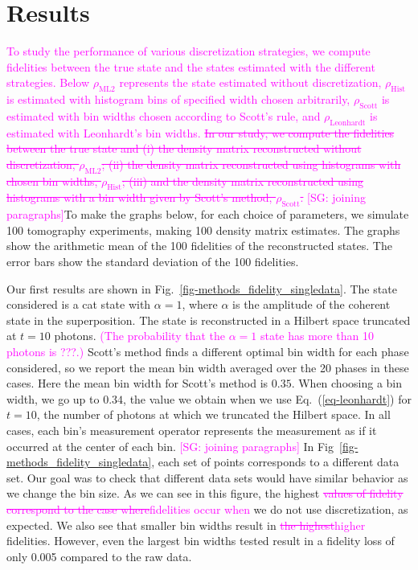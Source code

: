 \documentclass[
reprint,
superscriptaddress,
showpacs,
amsmath,
amssymb,
aps,
pra,
longbibliography
]{revtex4-1}
\providecommand{\aucmnt}[1]{#1}
\providecommand{\editcolor}[2]{\textcolor{#1}{#2}}
\providecommand{\aucmnt}[1]{}
\providecommand{\editcolor}[2]{#2}
\newcommand{\SG}[1]{\editcolor{magenta}{#1}}
\newcommand{\SGs}[1]{\aucmnt{\editcolor{magenta}{\sout{#1}}}}
\newcommand{\SGc}[1]{\aucmnt{\editcolor{magenta}{[SG: #1]}}}
\begin{document}
\section{Results}
\label{results}
\SG{To study the performance of various discretization strategies, we
  compute fidelities between the true state and the states estimated
  with the different strategies. Below $\rho_{\mathrm{ML2}}$
  represents the state estimated without discretization,
  $\rho_{\mathrm{Hist}}$ is estimated with histogram bins of specified
  width chosen arbitrarily, $\rho_{\mathrm{Scott}}$ is estimated with
  bin widths chosen according to Scott's rule, and
  $\rho_{\mathrm{Leonhardt}}$ is estimated with Leonhardt's bin
  widths.} \SGs{In our study, we compute the fidelities between the
  true state and (i) the density matrix reconstructed without
  discretization, $\rho_{\mathrm{ML2}}$; (ii) the density matrix
  reconstructed using histograms with chosen bin widths,
  $\rho_{\mathrm{Hist}}$; (iii) and the density matrix reconstructed
  using histograms with a bin width given by Scott's method,
  $\rho_{\mathrm{Scott}}$.}  \SGc{joining paragraphs}To make the
graphs below, for each choice of parameters, we simulate 100
tomography experiments, making 100 density matrix estimates.  The
graphs show the arithmetic mean of the 100 fidelities of the
reconstructed states. The error bars show the standard deviation of
the 100 fidelities.

Our first results are shown in
Fig.~\ref{fig-methods_fidelity_singledata}. The state considered is a
cat state with $\alpha = 1$, where $\alpha$ is the amplitude of the
coherent state in the superposition.  The state is reconstructed in a
Hilbert space truncated at $t=10$ photons. \SG{(The probability that
  the $\alpha=1$ state has more than 10 photons is ???.)} Scott's
method finds a different optimal bin width for each phase considered,
so we report the mean bin width averaged over the 20 phases in these
cases.  Here the mean bin width for Scott's method is $0.35$.  When
choosing a bin width, we go up to $0.34$, the value we obtain when we
use Eq.~(\ref{eq-leonhardt}) for $t=10$, the number of photons at
which we truncated the Hilbert space.  In all cases, each bin's
measurement operator represents the measurement as if it occurred at
the center of each bin. \SGc{joining paragraphs} In
Fig~\ref{fig-methods_fidelity_singledata}, each set of points
corresponds to a different data set. Our goal was to check that
different data sets would have similar behavior as we change the bin
size. As we can see in this figure, the highest \SGs{values of
  fidelity correspond to the case where}\SG{fidelities occur when} we
do not use discretization, as expected.  We also see that smaller bin
widths result in \SGs{the highest}\SG{higher} fidelities.  However,
even the largest bin widths tested result in a fidelity loss of only
0.005 compared to the raw data.
\end{document}
